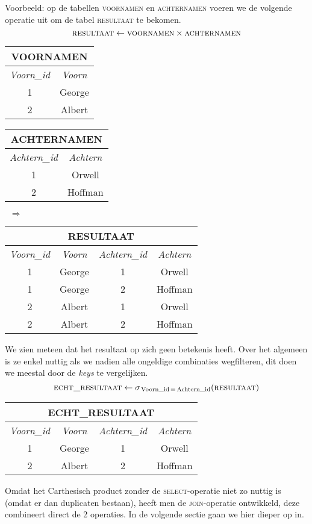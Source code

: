 \noindent Voorbeeld: op de tabellen \textsc{voornamen} en \textsc{achternamen} voeren we de volgende operatie uit om de tabel \textsc{resultaat} te bekomen.
\vspace{-2mm}
\[ \textsc{resultaat} \leftarrow \textsc{voornamen} \times \textsc{achternamen} \]
\begin{center}
\begin{tabular}{|c|c|}
\hline
\multicolumn{2}{|c|}{\textbf{VOORNAMEN}} \\
\hline
\textit{Voorn\_id} & \textit{Voorn} \\ \hline
1 & George \\ \hline
2 & Albert \\
\hline
\end{tabular}
\begin{tabular}{|c|c|}
\hline
\multicolumn{2}{|c|}{\textbf{ACHTERNAMEN}} \\
\hline
\textit{Achtern\_id} & \textit{Achtern} \\ \hline
1 & Orwell \\ \hline
2 & Hoffman \\
\hline
\end{tabular}
$\;\;\Longrightarrow\;\;$
\begin{tabular}{|c|c|c|c|}
\hline
\multicolumn{4}{|c|}{\textbf{RESULTAAT}} \\
\hline
\textit{Voorn\_id} & \textit{Voorn} & \textit{Achtern\_id} & \textit{Achtern}\\ \hline
1 & George & 1 & Orwell\\ \hline
1 & George & 2 & Hoffman\\ \hline
2 & Albert & 1 & Orwell\\ \hline
2 & Albert & 2 & Hoffman\\
\hline
\end{tabular}
\end{center}
We zien meteen dat het resultaat op zich geen betekenis heeft. Over het algemeen is ze enkel nuttig als we nadien alle ongeldige combinaties wegfilteren, dit doen we meestal door de \textit{keys} te vergelijken.
\vspace{-2mm}
\[ \textsc{echt\_resultaat} \leftarrow \sigma_{\,\text{Voorn\_id} \,=\, \text{Achtern\_id}}(\textsc{resultaat}) \]
\begin{center}
\begin{tabular}{|c|c|c|c|}
\hline
\multicolumn{4}{|c|}{\textbf{ECHT\_RESULTAAT}} \\
\hline
\textit{Voorn\_id} & \textit{Voorn} & \textit{Achtern\_id} & \textit{Achtern}\\ \hline
1 & George & 1 & Orwell\\ \hline
2 & Albert & 2 & Hoffman\\
\hline
\end{tabular}
\end{center}
Omdat het Carthesisch product zonder de \textsc{select}-operatie niet zo nuttig is (omdat er dan duplicaten bestaan), heeft men de \textsc{join}-operatie ontwikkeld, deze combineert direct de 2 operaties. In de volgende sectie gaan we hier dieper op in.

